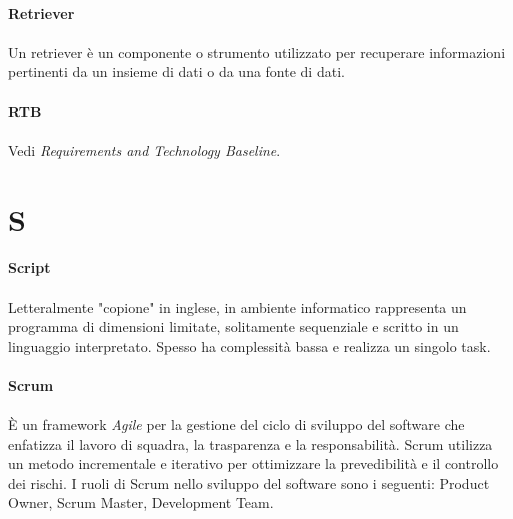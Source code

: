 \documentclass[10pt, a4paper]{article}
\begin{document}
\vspace{2em}
\paragraph{Retriever}\noindent\hrulefill
\paragraph{}Un retriever è un componente o strumento utilizzato per recuperare informazioni pertinenti da un insieme di dati o da una fonte di dati.


\vspace{2em}
\paragraph{RTB}\noindent\hrulefill 
\paragraph{}Vedi \textit{Requirements and Technology Baseline\pg}.


\newpage
\section{S}

\vspace{2em}
\paragraph{Script}\noindent\hrulefill
\paragraph{}Letteralmente "copione" in inglese, in ambiente informatico rappresenta un programma di dimensioni limitate, solitamente sequenziale e scritto in un linguaggio interpretato. Spesso ha complessità bassa e realizza un singolo task.

\vspace{2em}
\paragraph{Scrum}\noindent\hrulefill
\paragraph{}È un framework  \textit{Agile\pg} per la gestione del ciclo di sviluppo del software che enfatizza il lavoro di squadra, la trasparenza e la responsabilità. Scrum utilizza un metodo incrementale e iterativo per ottimizzare la prevedibilità e il controllo dei rischi.
I ruoli di Scrum nello sviluppo del software sono i seguenti: Product Owner, Scrum Master, Development Team.
\end{document}
